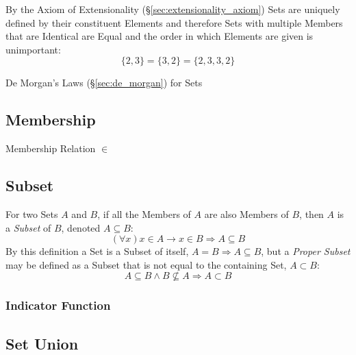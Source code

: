 By the Axiom of Extensionality (\S\ref{sec:extensionality_axiom}) Sets
are uniquely defined by their constituent Elements and therefore Sets
with multiple Members that are Identical are Equal and the order in
which Elements are given is unimportant:
\[
  \{ 2, 3 \} = \{ 3, 2 \} = \{ 2, 3, 3, 2 \}
\]

De Morgan's Laws (\S\ref{sec:de_morgan}) for Sets



\subsection{Membership}\label{sec:membership}

Membership Relation $\in$



\subsection{Subset}\label{sec:subset}

For two Sets $A$ and $B$, if all the Members of $A$ are also Members
of $B$, then $A$ is a \emph{Subset} of $B$, denoted $A \subseteq B$:
\[
  (\forall x) x \in A \rightarrow x \in B \Rightarrow A \subseteq B
\]
By this definition a Set is a Subset of itself, $A = B \Rightarrow A
\subseteq B$, but a \emph{Proper Subset} may be defined as a Subset
that is not equal to the containing Set, $A \subset B$:
\[
  A \subseteq B \wedge B \nsubseteq A \Rightarrow A \subset B
\]



\subsubsection{Indicator Function}\label{sec:indicator_function}



\subsection{Set Union}\label{sec:set_union}

